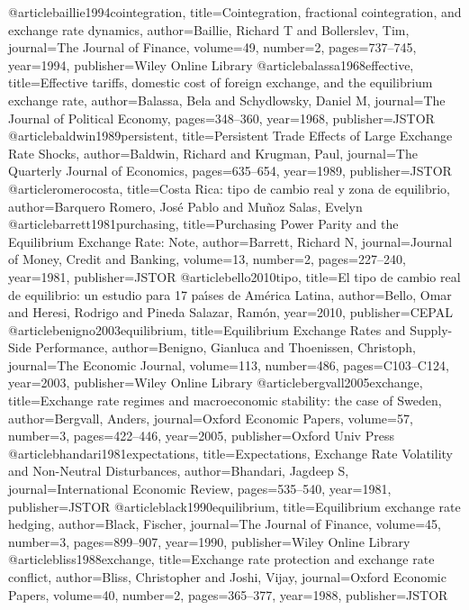@article{baillie1994cointegration,
  title={Cointegration, fractional cointegration, and exchange rate dynamics},
  author={Baillie, Richard T and Bollerslev, Tim},
  journal={The Journal of Finance},
  volume={49},
  number={2},
  pages={737--745},
  year={1994},
  publisher={Wiley Online Library}
}
@article{balassa1968effective,
  title={Effective tariffs, domestic cost of foreign exchange, and the equilibrium exchange rate},
  author={Balassa, Bela and Schydlowsky, Daniel M},
  journal={The Journal of Political Economy},
  pages={348--360},
  year={1968},
  publisher={JSTOR}
}
@article{baldwin1989persistent,
  title={Persistent Trade Effects of Large Exchange Rate Shocks},
  author={Baldwin, Richard and Krugman, Paul},
  journal={The Quarterly Journal of Economics},
  pages={635--654},
  year={1989},
  publisher={JSTOR}
}
@article{romerocosta,
  title={Costa Rica: tipo de cambio real y zona de equilibrio},
  author={Barquero Romero, Jos{\'e} Pablo and Mu{\~n}oz Salas, Evelyn }
}
@article{barrett1981purchasing,
  title={Purchasing Power Parity and the Equilibrium Exchange Rate: Note},
  author={Barrett, Richard N},
  journal={Journal of Money, Credit and Banking},
  volume={13},
  number={2},
  pages={227--240},
  year={1981},
  publisher={JSTOR}
}
@article{bello2010tipo,
  title={El tipo de cambio real de equilibrio: un estudio para 17 pa{\'\i}ses de Am{\'e}rica Latina},
  author={Bello, Omar and Heresi, Rodrigo and Pineda Salazar, Ram{\'o}n},
  year={2010},
  publisher={CEPAL}
}
@article{benigno2003equilibrium,
  title={Equilibrium Exchange Rates and Supply-Side Performance},
  author={Benigno, Gianluca and Thoenissen, Christoph},
  journal={The Economic Journal},
  volume={113},
  number={486},
  pages={C103--C124},
  year={2003},
  publisher={Wiley Online Library}
}
@article{bergvall2005exchange,
  title={Exchange rate regimes and macroeconomic stability: the case of Sweden},
  author={Bergvall, Anders},
  journal={Oxford Economic Papers},
  volume={57},
  number={3},
  pages={422--446},
  year={2005},
  publisher={Oxford Univ Press}
}
@article{bhandari1981expectations,
  title={Expectations, Exchange Rate Volatility and Non-Neutral Disturbances},
  author={Bhandari, Jagdeep S},
  journal={International Economic Review},
  pages={535--540},
  year={1981},
  publisher={JSTOR}
}
@article{black1990equilibrium,
  title={Equilibrium exchange rate hedging},
  author={Black, Fischer},
  journal={The Journal of Finance},
  volume={45},
  number={3},
  pages={899--907},
  year={1990},
  publisher={Wiley Online Library}
}
@article{bliss1988exchange,
  title={Exchange rate protection and exchange rate conflict},
  author={Bliss, Christopher and Joshi, Vijay},
  journal={Oxford Economic Papers},
  volume={40},
  number={2},
  pages={365--377},
  year={1988},
  publisher={JSTOR}
}
